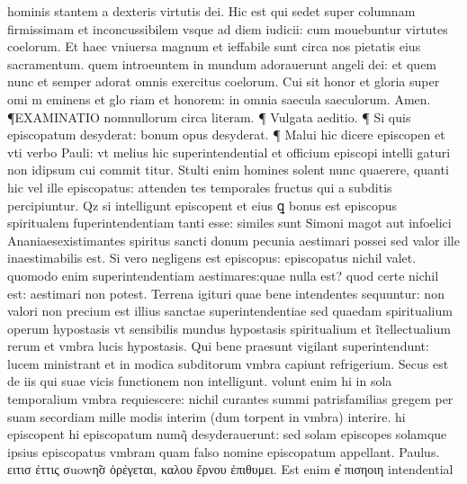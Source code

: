 \documentclass{article}
\begin{document}
\begin{pages}
hominis stantem a dexteris virtutis dei. Hic est qui sedet super columnam firmissimam et inconcussibilem vsque ad diem iudicii: cum mouebuntur virtutes coelorum. Et haec vniuersa magnum et ieffabile sunt circa nos pietatis eius sacramentum. quem introeuntem in mundum adorauerunt angeli dei: et quem nunc et semper adorat omnis exercitus coelorum. Cui sit honor et gloria super omi m eminens et glo riam et honorem: in omnia saecula saeculorum. Amen.  \pend\pstart ¶EXAMINATIO nomnullorum circa literam. ¶ Vulgata aeditio. ¶ Si quis episcopatum desyderat: bonum opus desyderat. ¶ Malui hic dicere episcopen et vti verbo Pauli: vt melius hic superintendential et officium episcopi intelli gaturi non idipsum cui commit titur. Stulti enim homines solent nunc quaerere, quanti hic vel ille episcopatus: attenden tes temporales fructus qui a subditis percipiuntur. Qz si intelligunt episcopent et eius ꝗ bonus est episcopus spiritualem fuperintendentiam tanti esse: similes sunt Simoni magot aut infoelici Ananiaesexistimantes spiritus sancti donum pecunia aestimari possei sed valor ille inaestimabilis est. Si vero negligens est episcopus: episcopatus nichil valet. quomodo enim superintendentiam aestimares:quae nulla est? quod certe nichil est: aestimari non potest. Terrena igituri quae bene intendentes sequuntur: non valori non precium est illius sanctae superintendentiae sed quaedam spiritualium operum hypostasis vt sensibilis mundus hypostasis spiritualium et ĩtellectualium rerum et vmbra lucis hypostasis. Qui bene praesunt vigilant superintendunt: lucem ministrant et in modica subditorum vmbra capiunt refrigerium. Secus est de iis qui suae vicis functionem non intelligunt. volunt enim hi in sola temporalium vmbra requiescere: nichil curantes summi patrisfamilias gregem per suam secordiam mille modis interim (dum torpent in vmbra) interire. hi episcopent hi episcopatum numq̃ desyderauerunt: sed solam episcopes solamque ipsius episcopatus vmbram quam falso nomine episcopatum appellant. Paulus. ειτισ ἐττις σuowη̃σ ὀρέγεται, καλου ἔρνου ἐπιθυμει. Est enim e̓ πισηοιη intendential  \pend

\end{pages}
\end{document}
